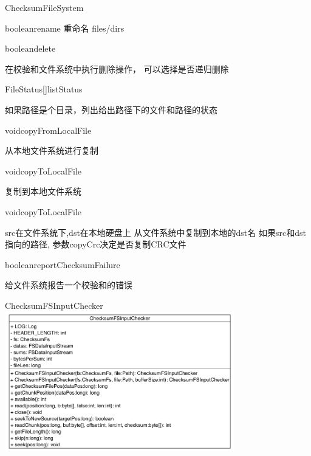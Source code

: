 \begin{XeClass}{ChecksumFileSystem}
\begin{XeMethod}{\XePublic}{boolean}{rename}
 重命名 files/dirs

    \end{XeMethod}

    \begin{XeMethod}{\XePublic}{boolean}{delete}
         
 在校验和文件系统中执行删除操作，
 可以选择是否递归删除

    \end{XeMethod}

    \begin{XeMethod}{\XePublic}{FileStatus[]}{listStatus}
         
 如果路径是个目录，列出给出路径下的文件和路径的状态

    \end{XeMethod}

    \begin{XeMethod}{\XePublic}{void}{copyFromLocalFile}
         
 从本地文件系统进行复制

    \end{XeMethod}

    \begin{XeMethod}{\XePublic}{void}{copyToLocalFile}
         
 复制到本地文件系统

    \end{XeMethod}

    \begin{XeMethod}{\XePublic}{void}{copyToLocalFile}
         
 src在文件系统下,dst在本地硬盘上
 从文件系统中复制到本地的dst名
 如果src和dst指向的路径, 参数copyCrc决定是否复制CRC文件

    \end{XeMethod}

    \begin{XeMethod}{\XePublic}{boolean}{reportChecksumFailure}
         
 给文件系统报告一个校验和的错误

    \end{XeMethod}

    \begin{XeInnerClass}{ChecksumFSInputChecker}
\includegraphics[width=10cm]{cdig/ChecksumFSInputChecker.png}
         

\end{XeInnerClass}
\end{XeClass}
